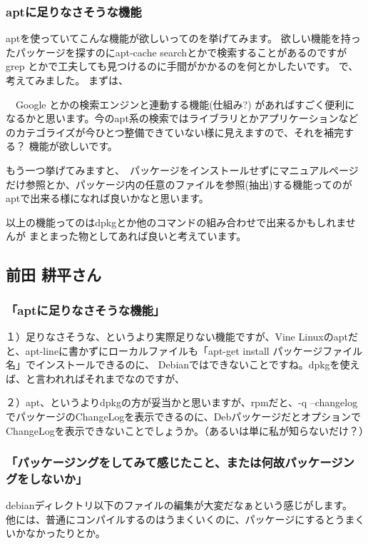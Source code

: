\documentclass[mingoth,a4paper]{jsarticle}
\begin{document}
\subsubsection*{aptに足りなさそうな機能}

aptを使っていてこんな機能が欲しいってのを挙げてみます。
欲しい機能を持ったパッケージを探すのにapt-cache searchとかで検索することがあるのですが
grep とかで工夫しても見つけるのに手間がかかるのを何とかしたいです。
で、考えてみました。
まずは、

　Google とかの検索エンジンと連動する機能(仕組み?)  があればすごく便利に
なるかと思います。今のapt系の検索ではライブラリとかアプリケーションなど
のカテゴライズが今ひとつ整備できていない様に見えますので、それを補完する？
機能が欲しいです。

もう一つ挙げてみますと、　パッケージをインストールせずにマニュアルページ
だけ参照とか、パッケージ内の任意のファイルを参照(抽出)する機能ってのが
aptで出来る様になれば良いかなと思います。

以上の機能ってのはdpkgとか他のコマンドの組み合わせで出来るかもしれませんが
まとまった物としてあれば良いと考えています。

\subsection{前田 耕平さん}

\subsubsection*{「aptに足りなさそうな機能」}

１）足りなさそうな、というより実際足りない機能ですが、Vine
Linuxのaptだと、apt-lineに書かずにローカルファイルも「apt-get install
パッケージファイル名」でインストールできるのに、
Debianではできないことですね。dpkgを使えば、と言われればそれまでなのですが、

２）apt、というよりdpkgの方が妥当かと思いますが、rpmだと、-q
--changelogでパッケージのChangeLogを表示できるのに、DebパッケージだとオプションでChangeLogを表示できないことでしょうか。（あるいは単に私が知らないだけ？）

\subsubsection*{「パッケージングをしてみて感じたこと、または何故パッケージングをしないか」}

debianディレクトリ以下のファイルの編集が大変だなぁという感じがします。
他には、普通にコンパイルするのはうまくいくのに、パッケージにするとうまくいかなかったりとか。
\end{document}
